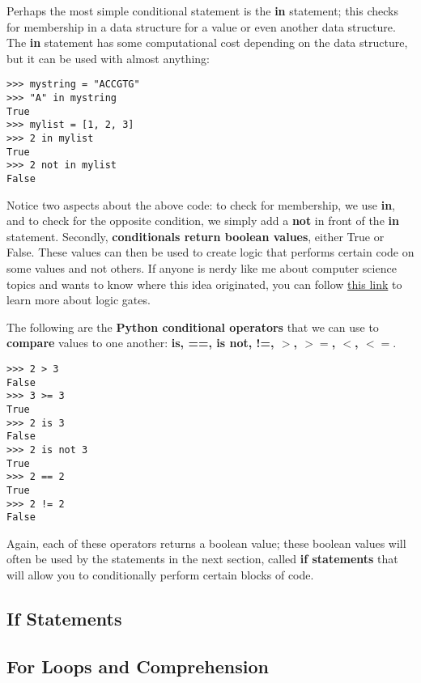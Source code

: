 \documentclass[a4paper,11pt]{article}
\begin{document}
Perhaps the most simple conditional statement is the \textbf{in} statement; this checks for membership 
in a data structure for a value or even another data structure.  The \textbf{in} statement has 
some computational cost depending on the data structure, but it can be used with almost anything:

\vspace{3mm}
\begin{lstlisting}
>>> mystring = "ACCGTG"
>>> "A" in mystring
True
>>> mylist = [1, 2, 3]
>>> 2 in mylist
True
>>> 2 not in mylist
False
\end{lstlisting}
\vspace{3mm}

Notice two aspects about the above code: to check for membership, we use \textbf{in}, and to check for the 
opposite condition, we simply add a \textbf{not} in front of the \textbf{in} statement.  Secondly, 
\textbf{conditionals return boolean values}, either True or False.  These values can then be used to 
create logic that performs certain code on some values and not others.  If anyone is nerdy like me 
about computer science topics and wants to know where this idea originated, you can follow 
\href{https://en.wikipedia.org/wiki/Logic_gate}{this link} to learn more about logic gates. \par

The following are the \textbf{Python conditional operators} that we can use to \textbf{compare} 
values to one another: \textbf{is, ==, is not, !=, $>$, $>=$, $<$, $<=$}.

\vspace{3mm}
\begin{lstlisting}
>>> 2 > 3
False
>>> 3 >= 3
True
>>> 2 is 3
False
>>> 2 is not 3
True
>>> 2 == 2
True
>>> 2 != 2
False
\end{lstlisting}
\vspace{3mm}

Again, each of these operators returns a boolean value; these boolean values will often be used 
by the statements in the next section, called \textbf{if statements} that will allow you to 
conditionally perform certain blocks of code.

\pagebreak
\subsection{If Statements}

\pagebreak
\subsection{For Loops and Comprehension}
\end{document}
